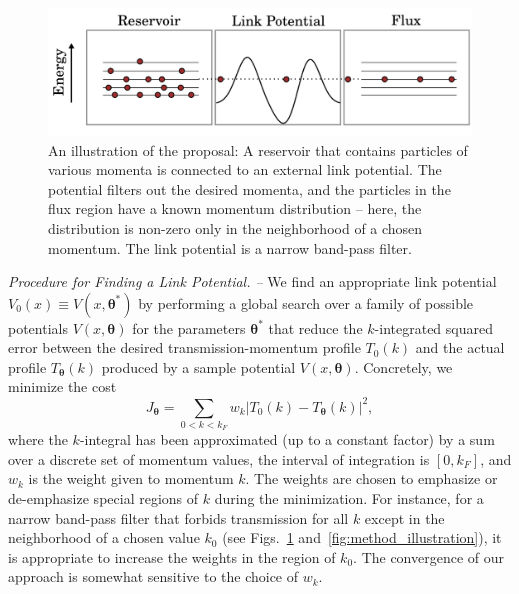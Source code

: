 \documentclass[reprint, twocolumn,amsmath,amssymb,showpacs,pra,superscriptaddress,aps]{revtex4-1}
\begin{document}
\begin{figure}
\centerline{\includegraphics[scale=0.4]{figure1new.pdf}}
\caption{An illustration of the proposal: A reservoir that contains particles of various momenta is connected to an external link potential. The potential filters out the desired momenta, and the particles in the flux region have a known momentum distribution -- here, the distribution is non-zero only in the neighborhood of a chosen momentum. The link potential is a narrow band-pass filter.
}
\label{fig:Figure1}
\end{figure}

{\it Procedure for Finding a Link Potential. --} 
We find an appropriate link potential $V_0(x) \equiv V(x,\bm{\theta}^*)$ by performing a global search over a family of possible potentials $V(x,\bm{\theta})$ for the parameters $\bm{\theta}^*$ that reduce the $k$-integrated squared error between the desired transmission-momentum profile $T_0(k)$ and the actual profile $T_{\bm\theta}(k)$ produced by a sample potential $V(x, \bm{\theta})$. Concretely, we minimize the cost
\begin{equation}\label{eq:cost1}
  J_{\bm{\theta}} = \sum_{0<k<k_F} w_k\left|T_0(k) - T_{\bm{\theta}}(k)\right|^2,
\end{equation}
where the $k$-integral has been approximated (up to a constant factor) by a sum over a discrete set of momentum values, the interval of integration is $[0,k_F]$, and $w_k$ is the weight given to momentum $k$. The weights are chosen to emphasize or de-emphasize special regions of $k$ during the minimization. For instance, for a narrow band-pass filter that forbids transmission for all $k$ except in the neighborhood of a chosen value $k_0$ (see Figs.~\ref{fig:Figure1} and~\ref{fig:method_illustration}), it is appropriate to increase the weights in the region of $k_0$. The convergence of our approach is somewhat sensitive to the choice of $w_k$.
\end{document}
